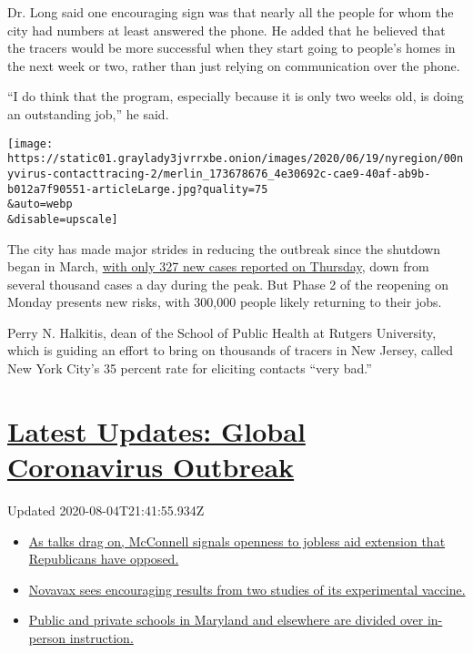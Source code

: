 Dr. Long said one encouraging sign was that nearly all the people for
whom the city had numbers at least answered the phone. He added that he
believed that the tracers would be more successful when they start going
to people's homes in the next week or two, rather than just relying on
communication over the phone.

``I do think that the program, especially because it is only two weeks
old, is doing an outstanding job,'' he said.

\texttt{[image: https://static01.graylady3jvrrxbe.onion/images/2020/06/19/nyregion/00nyvirus-contacttracing-2/merlin\_173678676\_4e30692c-cae9-40af-ab9b-b012a7f90551-articleLarge.jpg?quality=75\\\&auto=webp\\\&disable=upscale]}

The city has made major strides in reducing the outbreak since the
shutdown began in March,
\href{https://www.nytimes3xbfgragh.onion/interactive/2020/nyregion/new-york-city-coronavirus-cases.html\#cases}{with
only 327 new cases reported on Thursday}, down from several thousand
cases a day during the peak. But Phase 2 of the reopening on Monday
presents new risks, with 300,000 people likely returning to their jobs.

Perry N. Halkitis, dean of the School of Public Health at Rutgers
University, which is guiding an effort to bring on thousands of tracers
in New Jersey, called New York City's 35 percent rate for eliciting
contacts ``very bad.''

\hypertarget{latest-updates-global-coronavirus-outbreak}{%
\section{\texorpdfstring{\href{https://www.nytimes3xbfgragh.onion/2020/08/04/world/coronavirus-cases.html?action=click\&pgtype=Article\&state=default\&region=MAIN_CONTENT_1\&context=storylines_live_updates}{Latest
Updates: Global Coronavirus
Outbreak}}{Latest Updates: Global Coronavirus Outbreak}}\label{latest-updates-global-coronavirus-outbreak}}

Updated 2020-08-04T21:41:55.934Z

\begin{itemize}
\tightlist
\item
  \href{https://www.nytimes3xbfgragh.onion/2020/08/04/world/coronavirus-cases.html?action=click\&pgtype=Article\&state=default\&region=MAIN_CONTENT_1\&context=storylines_live_updates\#link-2daa96b5}{As
  talks drag on, McConnell signals openness to jobless aid extension
  that Republicans have opposed.}
\item
  \href{https://www.nytimes3xbfgragh.onion/2020/08/04/world/coronavirus-cases.html?action=click\&pgtype=Article\&state=default\&region=MAIN_CONTENT_1\&context=storylines_live_updates\#link-1228a480}{Novavax
  sees encouraging results from two studies of its experimental
  vaccine.}
\item
  \href{https://www.nytimes3xbfgragh.onion/2020/08/04/world/coronavirus-cases.html?action=click\&pgtype=Article\&state=default\&region=MAIN_CONTENT_1\&context=storylines_live_updates\#link-4825b93}{Public
  and private schools in Maryland and elsewhere are divided over
  in-person instruction.}
\end{itemize}


